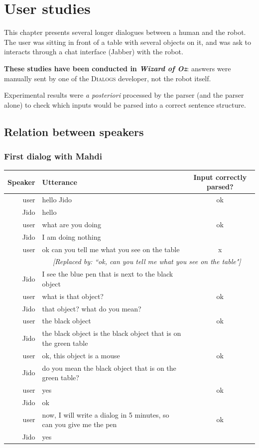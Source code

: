 \documentclass[twoside,a4paper,10pt]{report}
\newcommand{\chatN}[1]{{\footnotesize \textsf{#1}}}
\newcommand{\chatfix}[1]{
        & \multicolumn{2}{c}{\small \textit{[Replaced by: ``#1"]}}
        }
\newenvironment{dialog}
{
\rowcolors{1}{lightgreen1}{lightgreen2}

\begin{center}
    \begin{longtable}{r|p{7cm}|c}
    \hline \textbf{Speaker} & \textbf{Utterance} & Input correctly parsed? \\ 
    \hline 
    \endhead
}
{
    \hline
    \end{longtable}
\end{center}
}
\begin{document}
\chapter{User studies}
\label{8e39c880b382a46f3aac08dd30b0e029}%

This chapter presents several longer dialogues between a human and the robot. The user was sitting in front of a table with several objects on it, and was ask to interacts through a chat interface (Jabber) with the robot.

\textbf{These studies have been conducted in \textit{Wizard of Oz}}: answers were manually sent by one of the \textsc{Dialogs} developer, not the robot itself.

Experimental results were \textit{a posteriori} processed by the parser (and the parser alone) to check which inputs would be parsed into a correct sentence structure.

\section{Relation between speakers}

\subsection{First dialog with Mahdi}

\begin{dialog}
    \chatN{user} & hello Jido & ok \\
    \chatN{Jido} & hello & \\
    \chatN{user} & what are you doing & ok \\
    \chatN{Jido} & I am doing nothing &  \\
    \chatN{user} & ok can you tell me what you see on the table & x \\
    \chatfix{ok, can you tell me what you see on the table} \\
    \chatN{Jido} & I see the blue pen that is next to the black object &  \\
    \chatN{user} & what is that object? & ok \\
    \chatN{Jido} & that object? what do you mean? &  \\
    \chatN{user} & the black object & ok \\
    \chatN{Jido} & the black object is the black object that is on the green table &  \\
    \chatN{user} & ok, this object is a mouse & ok \\
    \chatN{Jido} & do you mean the black object that is on the green table? &  \\
    \chatN{user} & yes & ok \\
    \chatN{Jido} & ok &  \\
    \chatN{user} & now, I will write a dialog in 5 minutes, so can you give me the pen & ok \\
    \chatN{Jido} & yes &  \\
\end{dialog}
\end{document}
